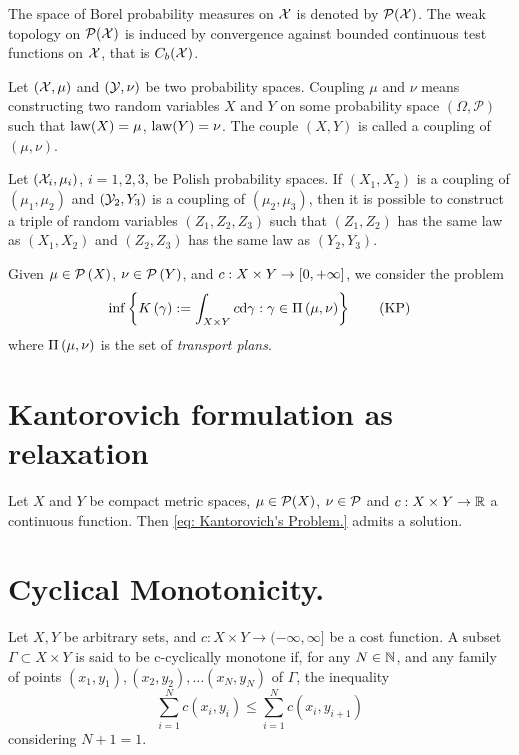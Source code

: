 \begin{definition}
The space of Borel probability measures on $\mathcal{X}$ is denoted by $\mathcal{P}(\mathcal{X})$. The weak topology on $\mathcal{P}(\mathcal{X})$ is induced by convergence against bounded continuous test functions on $\mathcal{X}$, that is $C_b(\mathcal{X})$.
\end{definition}

\begin{definition}[Coupling] Let $(\mathcal{X}, \mu)$ and $(\mathcal{Y}, \nu)$ be two probability spaces. Coupling $\mu$ and $\nu$ means constructing two random variables $X$ and $Y$ on some probability space $(\Omega, \mathcal{P})$ such that $\mathrm{law}(X)=\mu$, $\mathrm{law}(Y)=\nu$. The couple $(X,Y)$ is called a coupling of $(\mu, \nu)$.  
\end{definition}

\begin{theorem} Let $(\mathcal{X}_i , \mu_i)$, $i = 1, 2, 3$,  be Polish probability spaces. If
	$(X_1 , X_2)$ is a coupling of $(\mu_1, \mu_2 )$ and $(\mathcal{Y}_2 , Y_3)$ is a coupling of $(\mu_2, \mu_3)$, then it is possible to construct a triple of random variables $(Z_1 , Z_2, Z_3)$ such
	that $(Z_1, Z_2)$ has the same law as $(X_1 , X_2)$ and $(Z_2, Z_3)$ has the same
	law as $(Y_2 , Y_3)$.
\end{theorem}
\begin{problem}Given $\mu \in \mathcal{P}\left( X \right)$, $\nu \in \mathcal{P}\left( Y \right)$, and $c: X\times Y \rightarrow \left[ 0, +\infty \right]$, we consider the problem
	\begin{equation}
		\inf\left\lbrace K\left(\gamma\right) := \int_{X\times Y} c \mathrm{d}\gamma : \gamma \in \Pi\left(\mu, \nu\right) \right\rbrace\label{eq: Kantorovich's Problem.}\tag{KP}
	\end{equation}
where $\Pi\left(\mu, \nu\right)$ is the set of \textit{transport plans}.
\end{problem}
\section{Kantorovich formulation as relaxation}

\begin{theorem}
	Let $X$ and $Y$ be compact metric spaces, $\mu \in \mathcal{P}(X)$, $\nu \in  \mathcal{P}$ and
	$c:X\times Y \rightarrow \mathbb{R}$  a continuous function. Then  \eqref{eq: Kantorovich's Problem.} admits a solution.
\end{theorem} 



\section{Cyclical Monotonicity.}

\begin{definition}
	Let $X , Y$ be arbitrary sets, and $c:X\times Y \rightarrow (-\infty, \infty]$ be a cost function. A subset $\Gamma \subset X \times Y$ is said to be c-cyclically monotone if, for any $N\in\mathbb{N}$, and any family of points $(x_1, y_1), (x_2, y_2), \dots (x_N, y_N)$ of $\Gamma$, the inequality
	\begin{equation*}
		\sum_{i=1}^{N} c(x_i, y_i) \leq \sum_{i=1}^{N} c(x_i, y_{i+1}) 
	\end{equation*} 
	considering $N+1=1$. 
\end{definition}